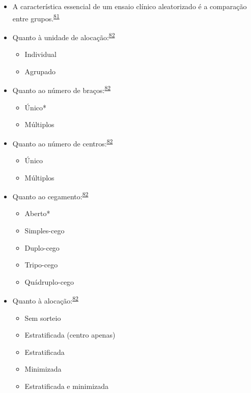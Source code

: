 \documentclass[
]{book}
\begin{document}
\begin{itemize}
\item
  A característica essencial de um ensaio clínico aleatorizado é a comparação entre grupos.\textsuperscript{\protect\hyperlink{ref-bland2011}{81}}
\item
  Quanto à unidade de alocação:\textsuperscript{\protect\hyperlink{ref-Bruce2022}{82}}

  \begin{itemize}
  \item
    Individual
  \item
    Agrupado
  \end{itemize}
\item
  Quanto ao número de braços:\textsuperscript{\protect\hyperlink{ref-Bruce2022}{82}}

  \begin{itemize}
  \item
    Único*
  \item
    Múltiplos
  \end{itemize}
\item
  Quanto ao número de centros:\textsuperscript{\protect\hyperlink{ref-Bruce2022}{82}}

  \begin{itemize}
  \item
    Único
  \item
    Múltiplos
  \end{itemize}
\item
  Quanto ao cegamento:\textsuperscript{\protect\hyperlink{ref-Bruce2022}{82}}

  \begin{itemize}
  \item
    Aberto*
  \item
    Simples-cego
  \item
    Duplo-cego
  \item
    Tripo-cego
  \item
    Quádruplo-cego
  \end{itemize}
\item
  Quanto à alocação:\textsuperscript{\protect\hyperlink{ref-Bruce2022}{82}}

  \begin{itemize}
  \item
    Sem sorteio
  \item
    Estratificada (centro apenas)
  \item
    Estratificada
  \item
    Minimizada
  \item
    Estratificada e minimizada
  \end{itemize}
\end{itemize}
\end{document}

